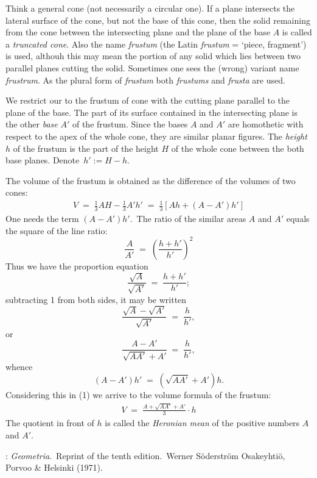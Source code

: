 \documentclass[12pt]{article}
\theoremstyle{definition}
\begin{document}
   

Think a general cone (not necessarily a circular one).  If a plane intersects the lateral surface of the cone, but not the base of this cone, then the solid remaining from the cone between the intersecting plane and the plane of the base $A$ is called a {\it truncated cone}.  Also the name {\it frustum} (the Latin {\it frustum} = `piece, fragment') is used, althouh this may mean the portion of any solid which lies between two parallel planes cutting the solid.  Sometimes one sees the (wrong) variant name {\it frustrum}.  As the plural form of {\em frustum} both {\em frustums} and {\em frusta} are used.

We restrict our to the frustum of cone with the cutting plane parallel to the plane of the base.  The part of its surface contained in the intersecting plane is the other {\em base} $A'$ of the frustum.  Since the bases $A$ and $A'$ are homothetic with respect to the apex of the whole cone, they are similar planar figures.  The {\it height} $h$ of the frustum is the part of the height $H$ of the whole cone between the both base planes.  Denote\, $h' := H\!-\!h$.

The volume of the frustum is obtained as the difference of the volumes of two cones:
\begin{align}
V \;=\; \frac{1}{3}AH-\frac{1}{3}A'h' \;=\; \frac{1}{3}\left[Ah\!+\!(A\!-\!A')h'\right]
\end{align}
One needs the term $(A\!-\!A')h'$.\, The ratio of the similar areas $A$ and $A'$ equals the square of the line ratio:
$$\frac{A}{A'} \;=\; \left(\frac{h\!+\!h'}{h'}\right)^2$$
Thus we have the proportion equation
$$\frac{\sqrt{A}}{\sqrt{A'}} \;=\; \frac{h\!+\!h'}{h'};$$
subtracting 1 from both sides, it may be written
$$\frac{\sqrt{A}-\sqrt{A'}}{\sqrt{A'}} \;=\; \frac{h}{h'},$$
or
$$\frac{A\!-\!A'}{\sqrt{AA'}\!+\!A'} \;=\; \frac{h}{h'},$$
whence
$$(A\!-\!A')h' \;=\; (\sqrt{AA'}\!+\!A')h.$$
Considering this in (1) we arrive to the volume formula of the frustum:
\begin{align}
V \;=\; \frac{A\!+\!\sqrt{AA'}\!+\!A'}{3} \cdot h
\end{align}
The quotient in front of $h$ is called the {\it Heronian mean} of the positive numbers $A$ and $A'$.

\begin{thebibliography}{8}
: {\it Geometria}.\, Reprint of the tenth edition.\, Werner S\"oderstr\"om Osakeyhti\"o, Porvoo \& Helsinki (1971).
\end{thebibliography}

\end{document}
